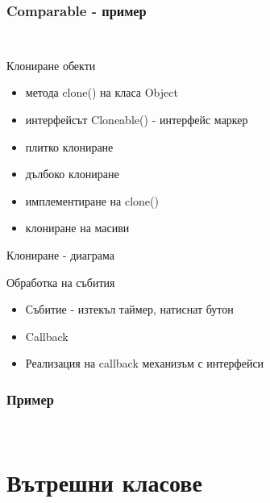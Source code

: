 \documentclass{beamer}
\begin{document}
\begin{frame}[fragile]
  \frametitle{Comparable - пример}
  \transdissolve
\begin{lstlisting}
  
\end{lstlisting}
\end{frame}

\begin{frame}{Клониране обекти}
  \transdissolve
  \begin{itemize}
  \item метода clone() на класа Object
  \item интерфейсът Cloneable() - интерфейс маркер
  \item плитко клониране
  \item дълбоко клониране
  \item имплементиране на clone()
  \item клониране на масиви
  \end{itemize}
\end{frame}


\begin{frame}{Клониране - диаграма}
  \transdissolve
  
\end{frame}

\begin{frame}{Обработка на събития}
  \transdissolve
  \begin{itemize}
  \item Събитие - изтекъл таймер, натиснат бутон
  \item Callback
  \item Реализация на callback механизъм с интерфейси
  \end{itemize}
\end{frame}

\begin{frame}[fragile]
  \frametitle{Пример}
  \transdissolve
\begin{lstlisting}
  
\end{lstlisting}
\end{frame}

\section{Вътрешни класове}
\end{document}
